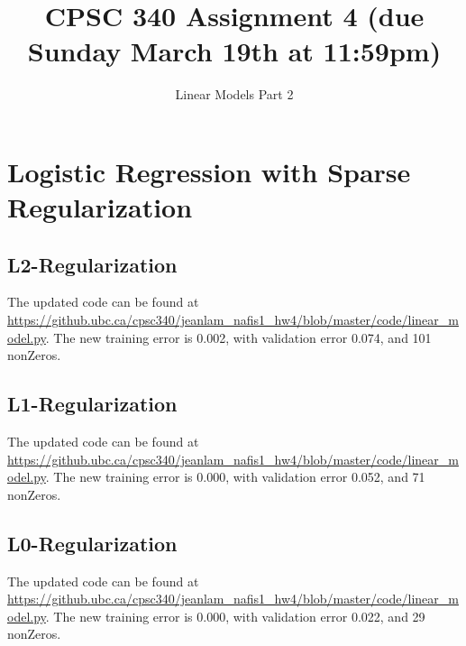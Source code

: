 \documentclass{article}
\begin{document}
\def\blu#1{{\color{blu}#1}}
\def\gre#1{{\color{gre}#1}}
\def\red#1{{\color{red}#1}}
\def\norm#1{\|#1\|}
\newcommand{\argmin}[1]{\mathop{\hbox{argmin}}_{#1}}
\newcommand{\argmax}[1]{\mathop{\hbox{argmax}}_{#1}}
\def\R{\mathbb{R}}
\newcommand{\fig}[2]{\texttt{[image: \#2]}}
\newcommand{\centerfig}[2]{\begin{center}\texttt{[image: \#2]}\end{center}}
\def\items#1{\begin{itemize}#1\end{itemize}}
\def\enum#1{\begin{enumerate}#1\end{enumerate}}
\newcommand{\half}{\frac 1 2}
\def\argmax{\mathop{\rm arg\,max}}
\def\argmin{\mathop{\rm arg\,min}}
\def\rubric#1{\gre{Rubric: \{#1\}}}{}


\title{CPSC 340 Assignment 4 (due Sunday March 19th at 11:59pm)}
\author{Linear Models Part 2}
\date{}
\maketitle


\section{Logistic Regression with Sparse Regularization}
\subsection{L2-Regularization}

\red{The updated code can be found at \url{https://github.ubc.ca/cpsc340/jeanlam_nafis1_hw4/blob/master/code/linear_model.py}. The new training error is 0.002, with validation error 0.074, and 101 nonZeros.}

\subsection{L1-Regularization}

\red{The updated code can be found at \url{https://github.ubc.ca/cpsc340/jeanlam_nafis1_hw4/blob/master/code/linear_model.py}. The new training error is 0.000, with validation error 0.052, and 71 nonZeros.}
\subsection{L0-Regularization}
\red{The updated code can be found at \url{https://github.ubc.ca/cpsc340/jeanlam_nafis1_hw4/blob/master/code/linear_model.py}. The new training error is 0.000, with validation error 0.022, and 29 nonZeros.}
\end{document}
